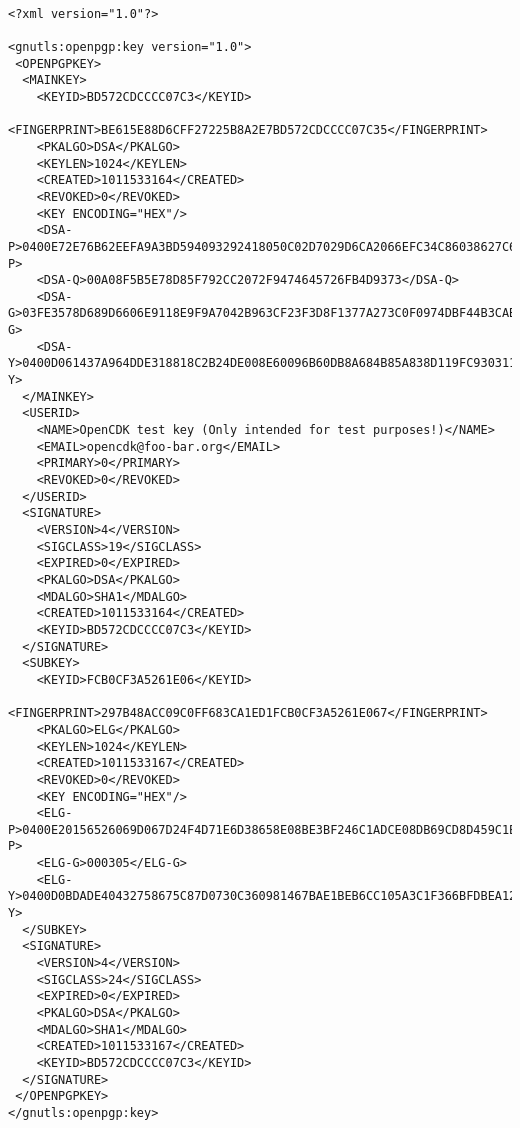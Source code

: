 \begin{verbatim}

<?xml version="1.0"?>

<gnutls:openpgp:key version="1.0">
 <OPENPGPKEY>
  <MAINKEY>
    <KEYID>BD572CDCCCC07C3</KEYID>
    <FINGERPRINT>BE615E88D6CFF27225B8A2E7BD572CDCCCC07C35</FINGERPRINT>
    <PKALGO>DSA</PKALGO>
    <KEYLEN>1024</KEYLEN>
    <CREATED>1011533164</CREATED>
    <REVOKED>0</REVOKED>
    <KEY ENCODING="HEX"/>
    <DSA-P>0400E72E76B62EEFA9A3BD594093292418050C02D7029D6CA2066EFC34C86038627C643EB1A652A7AF1D37CF46FC505AC1E0C699B37895B4BCB3E53541FFDA4766D6168C2B8AAFD6AB22466D06D18034D5DAC698E6993BA5B350FF822E1CD8702A75114E8B73A6B09CB3B93CE44DBB516C9BB5F95BB666188602A0A1447236C0658F</DSA-P>
    <DSA-Q>00A08F5B5E78D85F792CC2072F9474645726FB4D9373</DSA-Q>
    <DSA-G>03FE3578D689D6606E9118E9F9A7042B963CF23F3D8F1377A273C0F0974DBF44B3CABCBE14DD64412555863E39A9C627662D77AC36662AE449792C3262D3F12E9832A7565309D67BA0AE4DF25F5EDA0937056AD5BE89F4069EBD7EC76CE432441DF5D52FFFD06D39E5F61E36947B698A77CB62AB81E4A4122BF9050671D9946C865E</DSA-G>
    <DSA-Y>0400D061437A964DDE318818C2B24DE008E60096B60DB8A684B85A838D119FC930311889AD57A3B927F448F84EB253C623EDA73B42FF78BCE63A6A531D75A64CE8540513808E9F5B10CE075D3417B801164918B131D3544C8765A8ECB9971F61A09FC73D509806106B5977D211CB0E1D04D0ED96BCE89BAE8F73D800B052139CBF8D</DSA-Y>
  </MAINKEY>
  <USERID>
    <NAME>OpenCDK test key (Only intended for test purposes!)</NAME>
    <EMAIL>opencdk@foo-bar.org</EMAIL>
    <PRIMARY>0</PRIMARY>
    <REVOKED>0</REVOKED>
  </USERID>
  <SIGNATURE>
    <VERSION>4</VERSION>
    <SIGCLASS>19</SIGCLASS>
    <EXPIRED>0</EXPIRED>
    <PKALGO>DSA</PKALGO>
    <MDALGO>SHA1</MDALGO>
    <CREATED>1011533164</CREATED>
    <KEYID>BD572CDCCCC07C3</KEYID>
  </SIGNATURE>
  <SUBKEY>
    <KEYID>FCB0CF3A5261E06</KEYID>
    <FINGERPRINT>297B48ACC09C0FF683CA1ED1FCB0CF3A5261E067</FINGERPRINT>
    <PKALGO>ELG</PKALGO>
    <KEYLEN>1024</KEYLEN>
    <CREATED>1011533167</CREATED>
    <REVOKED>0</REVOKED>
    <KEY ENCODING="HEX"/>
    <ELG-P>0400E20156526069D067D24F4D71E6D38658E08BE3BF246C1ADCE08DB69CD8D459C1ED335738410798755AFDB79F1797CF022E70C7960F12CA6896D27CFD24A11CD316DDE1FBCC1EA615C5C31FEC656E467078C875FC509B1ECB99C8B56C2D875C50E2018B5B0FA378606EB6425A2533830F55FD21D649015615D49A1D09E9510F5F</ELG-P>
    <ELG-G>000305</ELG-G>
    <ELG-Y>0400D0BDADE40432758675C87D0730C360981467BAE1BEB6CC105A3C1F366BFDBEA12E378456513238B8AD414E52A2A9661D1DF1DB6BB5F33F6906166107556C813224330B30932DB7C8CC8225672D7AE24AF2469750E539B661EA6475D2E03CD8D3838DC4A8AC4AFD213536FE3E96EC9D0AEA65164B576E01B37A8DCA89F2B257D0</ELG-Y>
  </SUBKEY>
  <SIGNATURE>
    <VERSION>4</VERSION>
    <SIGCLASS>24</SIGCLASS>
    <EXPIRED>0</EXPIRED>
    <PKALGO>DSA</PKALGO>
    <MDALGO>SHA1</MDALGO>
    <CREATED>1011533167</CREATED>
    <KEYID>BD572CDCCCC07C3</KEYID>
  </SIGNATURE>
 </OPENPGPKEY>
</gnutls:openpgp:key>

\end{verbatim}
